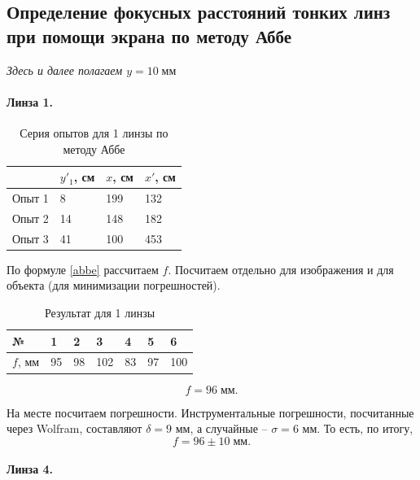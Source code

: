\documentclass[a4paper]{article}
\begin{document}
\subsection{Определение фокусных расстояний тонких линз при помощи экрана по методу Аббе}

\emph{Здесь и далее полагаем $ y = 10 \;мм $}

\label{abbe-1lens}
\paragraph{Линза 1.}

\begin{table}[h]
	\centering
	\begin{tabular}{|l|l|l|l|}
		\hline
		& $y'_1$, см & $x$, см & $x'$, см \\ \hline
		Опыт 1 & 8          & 199     & 132      \\ \hline
		Опыт 2 & 14         & 148     & 182      \\ \hline
		Опыт 3 & 41         & 100     & 453      \\ \hline
	\end{tabular}
	\caption{Серия опытов для 1 линзы по методу Аббе}
	\label{tab:1-abbe}
\end{table}


По формуле \eqref{abbe} рассчитаем $ f $. Посчитаем отдельно для изображения и для объекта (для минимизации погрешностей).

\begin{table}[h]
	\centering
	\begin{tabular}{|l|l|l|l|l|l|l|}
		\hline
		№       & 1  & 2  & 3   & 4  & 5  & 6   \\ \hline
		$f$, мм & 95 & 98 & 102 & 83 & 97 & 100 \\ \hline
	\end{tabular}
	\caption{Результат для 1 линзы}
	\label{tab:res1}
\end{table}

\begin{equation*}\label{key}
	f=96 \; мм.
\end{equation*}

На месте посчитаем погрешности. Инструментальные погрешности, посчитанные через Wolfram, составляют $ \delta = 9 $ мм, а случайные -- $ \sigma = 6 $ мм. То есть, по итогу,
\begin{equation*}\label{key}
	f=96\pm 10 \; мм.	
\end{equation*}

\paragraph{Линза 4.}
\end{document}
